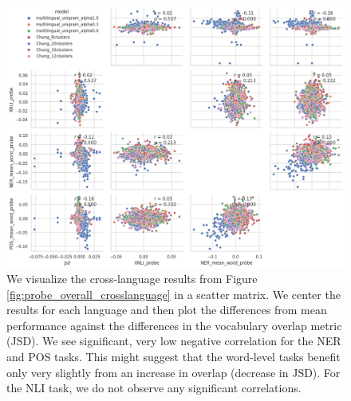 \begin{figure}[H]
    \centering
    \includegraphics[width=\textwidth]{img/temp/probe_overall_crosslanguage_scattermatrix.png}
    \caption{We visualize the cross-language results from Figure \ref{fig:probe_overall_crosslanguage} in a scatter matrix. We center the results for each language and then plot the differences from mean performance against the differences in the vocabulary overlap metric (JSD). We see significant, very low negative correlation for the NER and POS tasks. This might suggest that the word-level tasks benefit only very slightly from an increase in overlap (decrease in JSD). For the NLI task, we do not observe any significant correlations.}
    \label{fig:probe_overall_crosslanguage_scattermatrix}
\end{figure}



